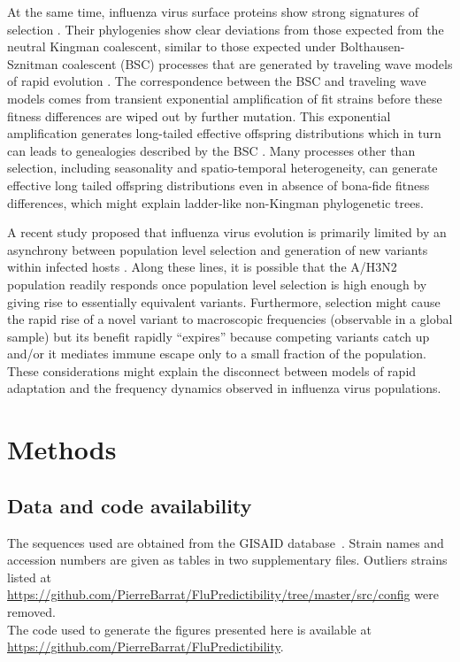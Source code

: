\documentclass[reprint,amsmath,amssymb,superscriptaddress,showpacs,rmp]{revtex4-1}
\begin{document}
At the same time, influenza virus surface proteins show strong signatures of selection \citep{bhatt_genomic_2011,strelkowa_clonal_2012}.
Their phylogenies show clear deviations from those expected from the neutral Kingman coalescent, similar to those expected under Bolthausen-Sznitman coalescent (BSC) processes that are generated by traveling wave models of rapid evolution \citep{neher_genealogies_2013,desai_genetic_2013}.
The correspondence between the BSC and traveling wave models comes from transient exponential amplification of fit strains before these fitness differences are wiped out by further mutation.
This exponential amplification generates long-tailed effective offspring distributions which in turn can leads to genealogies described by the BSC \citep{schweinsberg_coalescent_2003,neher_genealogies_2013}.
Many processes other than selection, including seasonality and spatio-temporal heterogeneity, can generate effective long tailed offspring distributions even in absence of bona-fide fitness differences, which might explain ladder-like non-Kingman phylogenetic trees.

A recent study proposed that influenza virus evolution is primarily limited by an asynchrony between population level selection and generation of new variants within infected hosts \citep{morris_asynchrony_2020}.
Along these lines, it is possible that the A/H3N2 population readily responds once population level selection is high enough by giving rise to essentially equivalent variants.
Furthermore, selection might cause the rapid rise of a novel variant to macroscopic frequencies (observable in a global sample) but its benefit rapidly ``expires'' because competing variants catch up and/or it mediates immune escape only to a small fraction of the population.
These considerations might explain the disconnect between models of rapid adaptation and the frequency dynamics observed in influenza virus populations.



\section*{Methods} %
\label{sec:methods}

\subsection*{Data and code availability} %
\label{sub:data}
	The sequences used are obtained from the GISAID database~\cite{shu2017gisaid}.
	Strain names and accession numbers are given as tables in two supplementary files. Outliers strains listed at \url{https://github.com/PierreBarrat/FluPredictibility/tree/master/src/config} were removed. \\
	The code used to generate the figures presented here is available at \url{https://github.com/PierreBarrat/FluPredictibility}.
\end{document}
